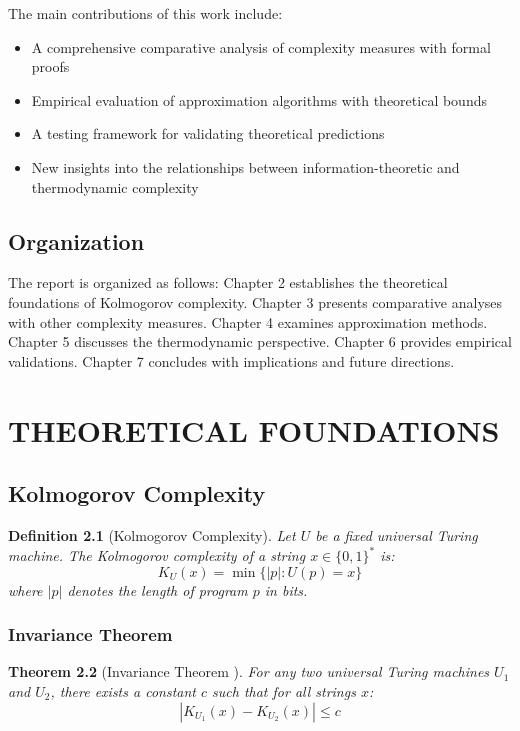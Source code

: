 \documentclass[12pt,a4paper]{report}
\newtheorem{theorem}{Theorem}[chapter]
\newtheorem{definition}[theorem]{Definition}
\begin{document}
The main contributions of this work include:
\begin{itemize}
    \item A comprehensive comparative analysis of complexity measures with formal proofs
    \item Empirical evaluation of approximation algorithms with theoretical bounds
    \item A testing framework for validating theoretical predictions
    \item New insights into the relationships between information-theoretic and thermodynamic complexity
\end{itemize}

\section{Organization}

The report is organized as follows: Chapter 2 establishes the theoretical foundations of Kolmogorov complexity. Chapter 3 presents comparative analyses with other complexity measures. Chapter 4 examines approximation methods. Chapter 5 discusses the thermodynamic perspective. Chapter 6 provides empirical validations. Chapter 7 concludes with implications and future directions.

\chapter{THEORETICAL FOUNDATIONS}

\section{Kolmogorov Complexity}

\begin{definition}[Kolmogorov Complexity]
Let $U$ be a fixed universal Turing machine. The Kolmogorov complexity of a string $x \in \{0,1\}^*$ is:
\begin{equation}
K_U(x) = \min\{|p| : U(p) = x\}
\end{equation}
where $|p|$ denotes the length of program $p$ in bits.
\end{definition}

\subsection{Invariance Theorem}

\begin{theorem}[Invariance Theorem \cite{li2008introduction}]
For any two universal Turing machines $U_1$ and $U_2$, there exists a constant $c$ such that for all strings $x$:
\begin{equation}
|K_{U_1}(x) - K_{U_2}(x)| \leq c
\end{equation}
\end{theorem}
\end{document}
